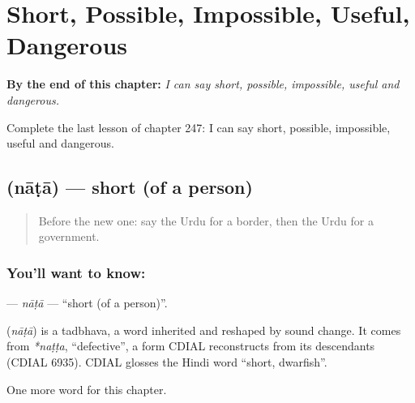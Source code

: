 
\chapter{Short, Possible, Impossible, Useful, Dangerous}
\label{ch:ur-short-possible-impossible-useful-dangerous}

\begin{chapteropening}
\textbf{By the end of this chapter:} \emph{I can say short, possible, impossible, useful and dangerous.}

Complete the last lesson of chapter 247: I can say short, possible, impossible, useful and dangerous.
\end{chapteropening}

\section[\texorpdfstring{\ur{ناٹا} (nāṭā)}{ناٹا (nāṭā)}]{ (nāṭā) — short (of a person)}

\label{lesson:UR-C247-nata}



\begin{quote}
Before the new one: say the Urdu for a border, then the Urdu for a government.
\end{quote}

\subsection*{You'll want to know: }
\textbf{} — \emph{nāṭā} — \textquotedblleft{}short (of a person)\textquotedblright{}.

\begin{cousinweb}
\textbf{} (\emph{nāṭā}) is a tadbhava, a word inherited and reshaped by sound change. It comes from \emph{*naṭṭa}, \textquotedblleft{}defective\textquotedblright{}, a form CDIAL reconstructs from its descendants (CDIAL 6935). CDIAL glosses the Hindi word \textquotedblleft{}short, dwarfish\textquotedblright{}.
\end{cousinweb}

\begin{grammarlens}[title={What you've built}]
One more word for this chapter.
\end{grammarlens}

